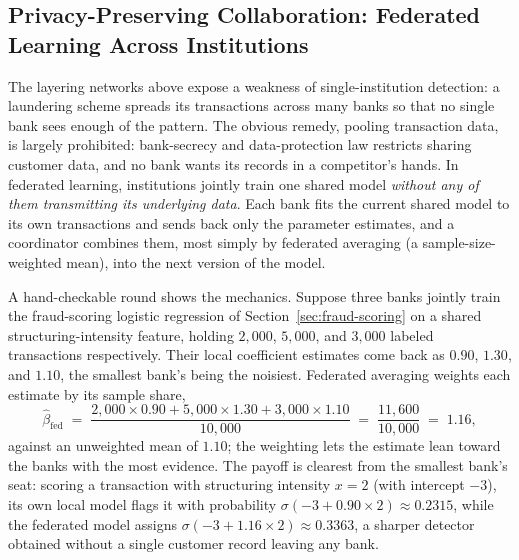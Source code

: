 \documentclass[../ai_in_finance]{subfiles}
\begin{document}
\subsection{Privacy-Preserving Collaboration: Federated Learning Across Institutions}
\label{sec:federated-aml}

The layering networks above expose a weakness of single-institution detection: a laundering scheme spreads its transactions across many banks so that no single bank sees enough of the pattern. The obvious remedy, pooling transaction data, is largely prohibited: bank-secrecy and data-protection law restricts sharing customer data, and no bank wants its records in a competitor's hands. In federated learning, institutions jointly train one shared model \emph{without any of them transmitting its underlying data}. Each bank fits the current shared model to its own transactions and sends back only the parameter estimates, and a coordinator combines them, most simply by federated averaging (a sample-size-weighted mean), into the next version of the model.

A hand-checkable round shows the mechanics. Suppose three banks jointly train the fraud-scoring logistic regression of Section~\ref{sec:fraud-scoring} on a shared structuring-intensity feature, holding $2{,}000$, $5{,}000$, and $3{,}000$ labeled transactions respectively. Their local coefficient estimates come back as $0.90$, $1.30$, and $1.10$, the smallest bank's being the noisiest. Federated averaging weights each estimate by its sample share,
\begin{equation*}
\hat\beta_{\text{fed}} \;=\; \frac{2{,}000 \times 0.90 + 5{,}000 \times 1.30 + 3{,}000 \times 1.10}{10{,}000} \;=\; \frac{11{,}600}{10{,}000} \;=\; 1.16,
\end{equation*}
against an unweighted mean of $1.10$; the weighting lets the estimate lean toward the banks with the most evidence. The payoff is clearest from the smallest bank's seat: scoring a transaction with structuring intensity $x=2$ (with intercept $-3$), its own local model flags it with probability $\sigma(-3 + 0.90 \times 2) \approx 0.2315$, while the federated model assigns $\sigma(-3 + 1.16 \times 2) \approx 0.3363$, a sharper detector obtained without a single customer record leaving any bank.
\end{document}
